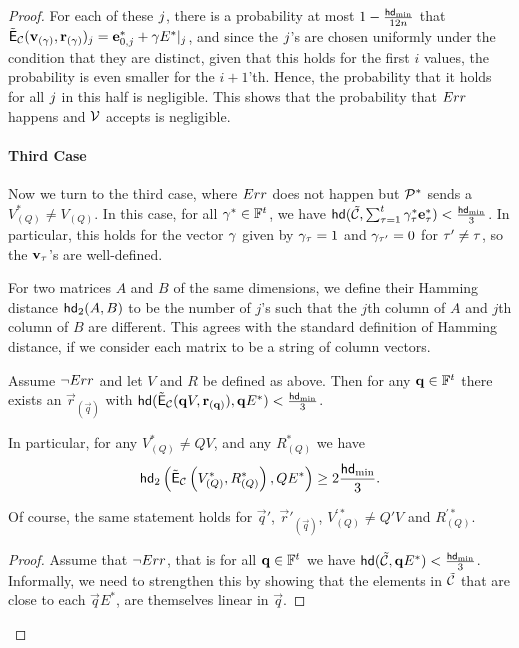 \begin{proof}
For each of these $j$, there is a probability at most $1-\frac{\mathsf{hd}_{\mathrm{min}}}{12n}$ that $\tilde{\mathsf{E}}_{\mathcal{C}}({\mathbf{v}}_{({\mathbf{\gamma}})},\mathbf{r}_{({\mathbf{\gamma}})})_j= \mathbf{e}^*_{0,j}+{\mathbf{\gamma}} E^*|_j$, and since the $j$'s are chosen uniformly under the condition that they are distinct, given that this holds for the first $i$ values, the probability is even smaller for the $i+1$'th. Hence, the probability that it holds for all $j$ in this half is negligible. This shows that the probability that $Err$ happens and $\mathcal{V}$ accepts is negligible. %

\paragraph{Third Case} Now we turn to the third case, where $Err$ does not happen but $\mathcal{P}^*$ sends a $V_{(Q)}^*\neq V_{(Q)}$.
In this case, for all ${\mathbf{\gamma}}^*\in \mathbb{F}^{{t_{}}}$, we have $\mathsf{hd}(\tilde{\mathcal{C}}, \sum^t_{\tau=1}{\mathbf{\gamma}}^*_\tau\mathbf{e}^*_\tau)< \frac{\mathsf{hd}_{\mathrm{min}}}{3}$. In particular, this holds for the vector ${\mathbf{\gamma}}$ given by ${\mathbf{\gamma}}_\tau=1$ and ${\mathbf{\gamma}}_{\tau'}=0$ for $\tau'\neq \tau$, so the ${\mathbf{v}}_\tau$'s are well-defined. 

For two matrices $A$ and $B$ of the same dimensions, we define their Hamming distance $\mathsf{hd}_2(A,B)$ to be the number of $j$'s such that the $j$th column of $A$ and $j$th column of $B$ are different. This agrees with the standard definition of Hamming distance, if we consider each matrix to be a string of column vectors.

\begin{lemma}\label{lem:goodlinearcombo}
Assume $\neg Err$ and let $V$ and $R$ be defined as above. 
Then for any $\mathbf{q}\in \mathbb{F}^{{t_{}}}$ there exists an $\vec{r}_{(\vec{q})}$ with $\mathsf{hd}(\tilde{\mathsf{E}}_{\mathcal{C}}(\mathbf{q} V, \mathbf{r}_{(\mathbf{q})}), \mathbf{q} E^*)< \frac{\mathsf{hd}_{\mathrm{min}}}{3}$. 

In particular, for any $V_{(Q)}^*\neq QV$, and any $R_{(Q)}^*$ we have 
\[ \mathsf{hd}_2\left(\tilde{\mathsf{E}}_{\mathcal{C}}\left(V_{(Q)}^*,R_{(Q)}^*\right),QE^*\right)\geq 2\frac{\mathsf{hd}_{\mathrm{min}}}{3}.\]
\end{lemma}

Of course, the same statement holds for $\vec{q}'$, $\vec{r}'_{(\vec{q})}$, $V_{(Q)}^{'*}\neq Q'V$ and $R_{(Q)}^{'*}$.

\begin{proof}
Assume that $\neg Err$, that is for all $\mathbf{q}\in \mathbb{F}^{{t_{}}}$ we have $\mathsf{hd}(\tilde{\mathcal{C}}, \mathbf{q} E^*)< \frac{\mathsf{hd}_{\mathrm{min}}}{3}$. Informally, we need to strengthen this by showing that the elements in $\tilde{\mathcal{C}}$ that are close to each $\vec{q} E^*$, are themselves linear in $\vec{q}$. 



\end{proof}
\end{proof}
